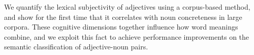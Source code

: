 We quantify the lexical subjectivity of adjectives using a corpus-based method, and show for the first time that it correlates with noun concreteness in large corpora. These cognitive dimensions together influence how word meanings combine, and we exploit this fact to achieve performance improvements on the semantic classification of adjective-noun pairs.
